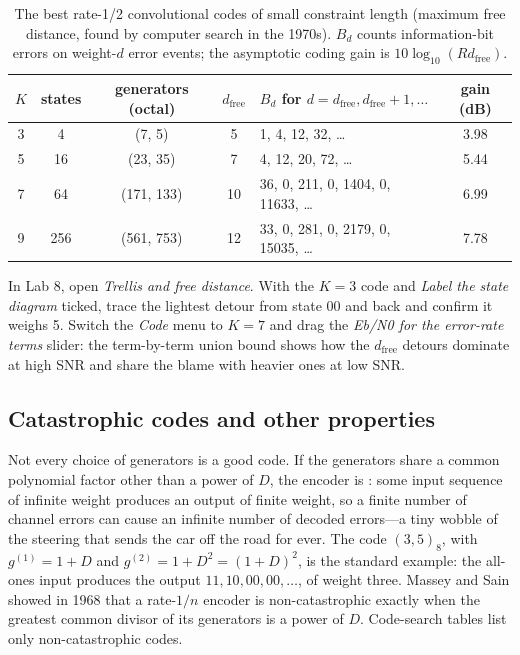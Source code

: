 \begin{table}[htbp]\centering\small
\caption{The best rate-1/2 convolutional codes of small constraint length (maximum free distance,
found by computer search in the 1970s). $B_d$ counts information-bit errors on weight-$d$ error
events; the asymptotic coding gain is $10\log_{10}(Rd_{\text{free}})$.}
\label{tab:ch14:conv}
\begin{tabular}{@{}c c c c l c@{}}
\toprule
$K$ & states & generators (octal) & $d_{\text{free}}$ & $B_d$ for $d=d_{\text{free}},d_{\text{free}}+1,\dots$ & gain (dB)\\
\midrule
3 & 4 & (7, 5) & 5 & 1, 4, 12, 32, \dots & 3.98\\
5 & 16 & (23, 35) & 7 & 4, 12, 20, 72, \dots & 5.44\\
7 & 64 & (171, 133) & 10 & 36, 0, 211, 0, 1404, 0, 11633, \dots & 6.99\\
9 & 256 & (561, 753) & 12 & 33, 0, 281, 0, 2179, 0, 15035, \dots & 7.78\\
\bottomrule
\end{tabular}
\end{table}

\begin{tryit}
In Lab 8, open \emph{Trellis and free distance}. With the $K=3$ code and \emph{Label the state
diagram} ticked, trace the lightest detour from state 00 and back and confirm it weighs 5. Switch
the \emph{Code} menu to $K=7$ and drag the \emph{Eb/N0 for the error-rate terms} slider: the
term-by-term union bound shows how the $d_{\text{free}}$ detours dominate at high SNR and share the
blame with heavier ones at low SNR.
\end{tryit}

\subsection{Catastrophic codes and other properties}

Not every choice of generators is a good code. If the generators share a common polynomial factor
other than a power of $D$, the encoder is : some input sequence of infinite weight
produces an output of finite weight, so a finite number of channel errors can cause an infinite
number of decoded errors---a tiny wobble of the steering that sends the car off the road for ever.
The code $(3,5)_8$, with $g^{(1)}=1+D$ and $g^{(2)}=1+D^2=(1+D)^2$, is the standard example: the
all-ones input produces the output $11,10,00,00,\dots$, of weight three. Massey and Sain showed in 1968
that a rate-$1/n$ encoder is non-catastrophic exactly when the greatest common divisor of its
generators is a power of $D$. Code-search tables list only non-catastrophic codes.

